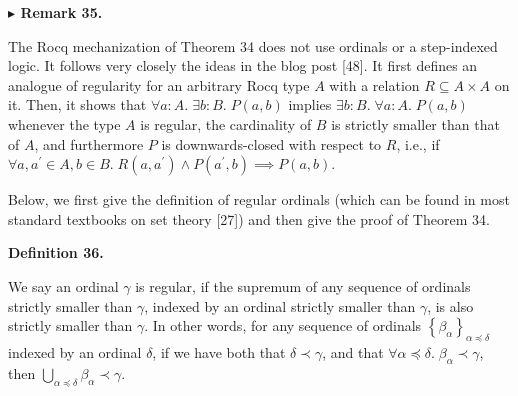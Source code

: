  
 
 
\par\medskip\noindent\textbf{$\blacktriangleright$ Remark 35.}\par
 
 
The Rocq mechanization of Theorem 34 does not use ordinals or a step-indexed logic. It follows very closely the ideas in the blog post [48]. It first defines an analogue of regularity for an arbitrary Rocq type $A$ with a relation $R\subseteq A\times A$ on it. Then, it shows that $\forall a:A.\;\exists b:B.\;P(a,b)$ implies $\exists b:B.\;\forall a:A.\;P(a,b)$ whenever the type $A$ is regular, the cardinality of $B$ is strictly smaller than that of $A$, and furthermore $P$ is downwards-closed with respect to $R$, i.e., if $\forall a,a^{\prime}\in A,b\in B.\;R(a,a^{\prime})\land P(a^{\prime},b)\implies P(a,b)$.\par
 
 
 
 
Below, we first give the definition of regular ordinals (which can be found in most standard textbooks on set theory [27]) and then give the proof of Theorem 34.\par
 
 
 
\par\medskip\noindent\textbf{Definition 36.}\par
 
 
We say an ordinal $\gamma$ is regular, if the supremum of any sequence of ordinals strictly smaller than $\gamma$, indexed by an ordinal strictly smaller than $\gamma$, is also strictly smaller than $\gamma$. In other words, for any sequence of ordinals $\left\{\beta_{\alpha}\right\}_{\alpha\preceq\delta}$ indexed by an ordinal $\delta$, if we have both that $\delta\prec\gamma$, and that $\forall\alpha\preceq\delta.\;\beta_{\alpha}\prec\gamma$, then $\bigcup_{\alpha\preceq\delta}\beta_{\alpha}\prec\gamma$.\par
 
 
